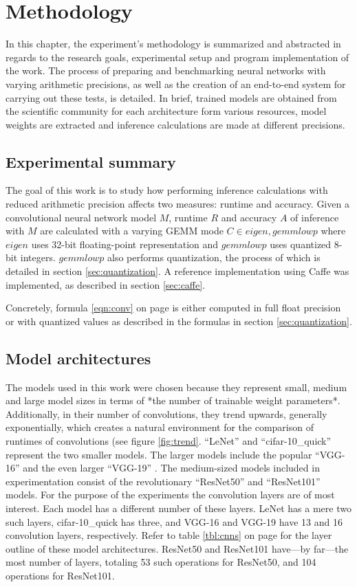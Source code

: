 \chapter{Methodology}

In this chapter, the experiment's methodology is summarized and abstracted in regards to the research goals, experimental setup and program implementation of the work. The process of preparing and benchmarking neural networks with varying arithmetic precisions, as well as the creation of an end-to-end system for carrying out these tests, is detailed. In brief, trained models are obtained from the scientific community for each architecture form various resources, model weights are extracted and inference calculations are made at different precisions.

\section{Experimental summary}
The goal of this work is to study how performing inference calculations with reduced arithmetic precision affects two measures: runtime and accuracy. Given a convolutional neural network model $M$, runtime $R$ and accuracy $A$ of inference with $M$ are calculated with a varying GEMM mode $C \in{eigen, gemmlowp}$ where $eigen$ \cite{eigen} uses 32-bit floating-point representation and $gemmlowp$ \cite{gemmlowp} uses quantized 8-bit integers. $gemmlowp$ also performs quantization, the process of which is detailed in section \ref{sec:quantization}. A reference implementation using Caffe \cite{caffe} was implemented, as described in section \ref{sec:caffe}.

Concretely, formula \ref{eqn:conv} on page \pageref{eqn:conv} is either computed in full float precision or with quantized values as described in the formulas in section \ref{sec:quantization}.

\section{Model architectures}
The models used in this work were chosen because they represent small, medium and large model sizes in terms of *the number of trainable weight parameters*. Additionally, in their number of convolutions, they trend upwards, generally exponentially, which creates a natural environment for the comparison of runtimes of convolutions (see figure \ref{fig:trend}. ``LeNet'' \cite{mnist} and ``cifar-10\_quick'' \cite{cifar} represent the two smaller models. The larger models include the popular ``VGG-16'' and the even larger ``VGG-19'' \cite{return}. The medium-sized models included in experimentation consist of the revolutionary ``ResNet50'' and ``ResNet101'' \cite{resnets2} models. For the purpose of the experiments the convolution layers are of most interest. Each model has a different number of these layers. LeNet has a mere two such layers, cifar-10\_quick has three, and VGG-16 and VGG-19 have 13 and 16 convolution layers, respectively. Refer to table \ref{tbl:cnns} on page \pageref{tbl:cnns} for the layer outline of these model architectures. ResNet50 and ResNet101 have---by far---the most number of layers, totaling 53 such operations for ResNet50, and 104 operations for ResNet101.

